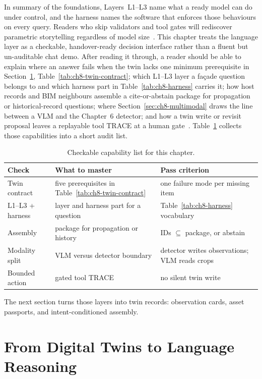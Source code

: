 In summary of the foundations, Layers~L1--L3 name what a ready model can do under control, and the harness names the software that enforces those behaviours on every query. Readers who skip validators and tool gates will rediscover parametric storytelling regardless of model size~\cite{ji2023,liang2023helm,ma2026tenquestions}. This chapter treats the language layer as a checkable, handover-ready decision interface rather than a fluent but un-auditable chat demo. After reading it through, a reader should be able to explain where an answer fails when the twin lacks one minimum prerequisite in Section~\ref{sec:ch8-dt-to-language}, Table~\ref{tab:ch8-twin-contract}; which L1--L3 layer a fa\c{c}ade question belongs to and which harness part in Table~\ref{tab:ch8-harness} carries it; how host records and BIM neighbours assemble a cite-or-abstain package for propagation or historical-record questions; where Section~\ref{sec:ch8-multimodal} draws the line between a VLM and the Chapter~6 detector; and how a twin write or revisit proposal leaves a replayable tool TRACE at a human gate~\cite{peng2024,yao2023react,liang2023helm,hellin2025bimmas}. Table~\ref{tab:ch8-outcomes} collects those capabilities into a short audit list.

\begin{table}[htbp]
\centering
\caption{Checkable capability list for this chapter.}
\label{tab:ch8-outcomes}
\begin{tabular}{llp{5.0cm}}
\toprule
Check & What to master & Pass criterion \\
\midrule
Twin contract & five prerequisites in Table~\ref{tab:ch8-twin-contract} & one failure mode per missing item \\
L1--L3 + harness & layer and harness part for a question & Table~\ref{tab:ch8-harness} vocabulary \\
Assembly & package for propagation or history & IDs $\subseteq$ package, or abstain \\
Modality split & VLM versus detector boundary & detector writes observations; VLM reads crops \\
Bounded action & gated tool TRACE & no silent twin write \\
\bottomrule
\end{tabular}
\end{table}

The next section turns those layers into twin records: observation cards, asset passports, and intent-conditioned assembly.

\section{From Digital Twins to Language Reasoning}
\label{sec:ch8-dt-to-language}

